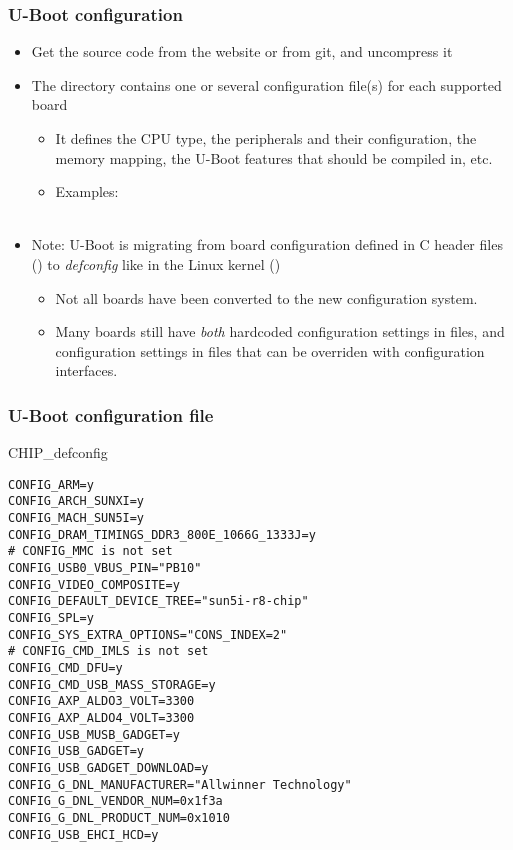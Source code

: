 \begin{frame}
  \frametitle{U-Boot configuration}
  \begin{itemize}
  \item Get the source code from the website or from git, and uncompress it
  \item The  directory contains one or several
        configuration file(s) for each supported board
    \begin{itemize}
    \item It defines the CPU type, the peripherals and their configuration, the
      memory mapping, the U-Boot features that should be compiled in, etc.
     \item Examples:\\
           \\
    \end{itemize}
  \item Note: U-Boot is migrating from board configuration defined in
    C header files () to {\em defconfig} like in
    the Linux kernel ()
    \begin{itemize}
    \item Not all boards have been converted to the new configuration
      system.
    \item Many boards still have {\em both} hardcoded configuration settings in
           files, and configuration settings in 
          files that can be overriden with configuration interfaces.
    \end{itemize}
  \end{itemize}
\end{frame}

\begin{frame}[fragile]
  \frametitle{U-Boot configuration file}
\begin{block}{CHIP\_defconfig}
\begin{Verbatim}[formatcom=\tiny\ttfamily]
CONFIG_ARM=y
CONFIG_ARCH_SUNXI=y
CONFIG_MACH_SUN5I=y
CONFIG_DRAM_TIMINGS_DDR3_800E_1066G_1333J=y
# CONFIG_MMC is not set
CONFIG_USB0_VBUS_PIN="PB10"
CONFIG_VIDEO_COMPOSITE=y
CONFIG_DEFAULT_DEVICE_TREE="sun5i-r8-chip"
CONFIG_SPL=y
CONFIG_SYS_EXTRA_OPTIONS="CONS_INDEX=2"
# CONFIG_CMD_IMLS is not set
CONFIG_CMD_DFU=y
CONFIG_CMD_USB_MASS_STORAGE=y
CONFIG_AXP_ALDO3_VOLT=3300
CONFIG_AXP_ALDO4_VOLT=3300
CONFIG_USB_MUSB_GADGET=y
CONFIG_USB_GADGET=y
CONFIG_USB_GADGET_DOWNLOAD=y
CONFIG_G_DNL_MANUFACTURER="Allwinner Technology"
CONFIG_G_DNL_VENDOR_NUM=0x1f3a
CONFIG_G_DNL_PRODUCT_NUM=0x1010
CONFIG_USB_EHCI_HCD=y
\end{Verbatim}
\end{block}
\end{frame}

